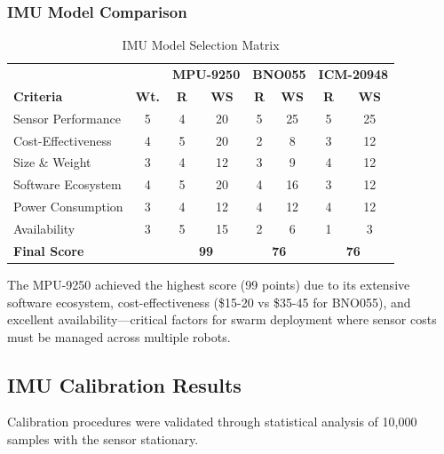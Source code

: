 \subsubsection{IMU Model Comparison}

\begin{table}[H]
\centering
\caption{IMU Model Selection Matrix}
\label{tab:imu_model_selection}
\begin{tabular}{|l|c|c|c|c|c|c|c|}
\hline
 & & \multicolumn{2}{c|}{\textbf{MPU-9250}} & \multicolumn{2}{c|}{\textbf{BNO055}} & \multicolumn{2}{c|}{\textbf{ICM-20948}} \\
\textbf{Criteria} & \textbf{Wt.} & \textbf{R} & \textbf{WS} & \textbf{R} & \textbf{WS} & \textbf{R} & \textbf{WS} \\
\hline
Sensor Performance & 5 & 4 & 20 & 5 & 25 & 5 & 25 \\
Cost-Effectiveness & 4 & 5 & 20 & 2 & 8 & 3 & 12 \\
Size \& Weight & 3 & 4 & 12 & 3 & 9 & 4 & 12 \\
Software Ecosystem & 4 & 5 & 20 & 4 & 16 & 3 & 12 \\
Power Consumption & 3 & 4 & 12 & 4 & 12 & 4 & 12 \\
Availability & 3 & 5 & 15 & 2 & 6 & 1 & 3 \\
\hline
\textbf{Final Score} & & \multicolumn{2}{c|}{\textbf{99}} & \multicolumn{2}{c|}{\textbf{76}} & \multicolumn{2}{c|}{\textbf{76}} \\
\hline
\end{tabular}
\end{table}

The MPU-9250 achieved the highest score (99 points) due to its extensive software ecosystem, cost-effectiveness (\$15-20 vs \$35-45 for BNO055), and excellent availability---critical factors for swarm deployment where sensor costs must be managed across multiple robots.

\subsection{IMU Calibration Results}

Calibration procedures were validated through statistical analysis of 10,000 samples with the sensor stationary.


